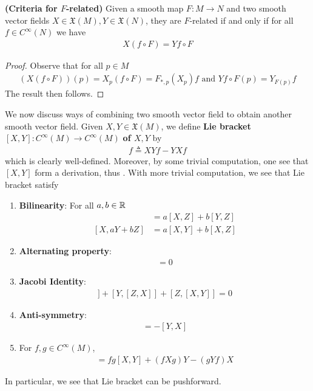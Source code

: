 \documentclass{report}
\begin{document}
\begin{theorem}
\label{Cfr}
\textbf{(Criteria for $F$-related)} Given a smooth map $F:M\rightarrow N$ and two smooth vector fields $X\in \mathfrak{X}(M),Y\in \mathfrak{X}(N)$, they are $F$-related if and only if for all  $f \in C^{\infty}(N)$ we have 
\begin{align*}
X(f \circ F)=Yf \circ F
\end{align*}
\end{theorem}
\begin{proof}
Observe that for all $p \in M$
\begin{align*}
  (X(f \circ F))(p)=X_p (f\circ F)=F_{*,p}(X_p)f\text{ and }Yf\circ F(p)=Y_{F(p)}f
\end{align*}
The result then follows. 
\end{proof}
\begin{mdframed}
We now discuss ways of combining two smooth vector field to obtain another smooth vector field. Given $X,Y \in \mathfrak{X}(M)$, we define \textbf{Lie bracket} $[X,Y]:C^{\infty}(M)\rightarrow C^{\infty}(M)$ \textbf{of $X,Y$} by 
\begin{align*}
[X,Y]f\triangleq XYf-YXf
\end{align*}
which is clearly well-defined. Moreover, by some trivial computation, one see that  $[X,Y]$ form a derivation, thus . With more trivial computation, we see that Lie bracket satisfy 
\begin{enumerate}[label=(\alph*)]
  \item \textbf{Bilinearity}: For all $a,b \in\mathbb{R}$ 
    \begin{align*}
    [aX+bY,Z]&=a[X,Z]+b[Y,Z]\\
    [X,aY+bZ]&= a[X,Y]+b[X,Z]
    \end{align*} 
    \item \textbf{Alternating property}: 
    \begin{align*}
    [X,X]=0
    \end{align*} 
    \item \textbf{Jacobi Identity}: 
    \begin{align*}
    [X,[Y,Z]]+[Y,[Z,X]]+[Z,[X,Y]]=0
    \end{align*} 
    \item \textbf{Anti-symmetry}:
      \begin{align*}
      [X,Y]=-[Y,X]
      \end{align*} 
      \item For $f,g\in C^{\infty}(M)$, 
        \begin{align*}
        [fX,gY]=fg[X,Y]+(fXg)Y-(gYf)X
        \end{align*}
\end{enumerate}
In particular, we see that Lie bracket can be pushforward.  
\end{mdframed}
\end{document}
